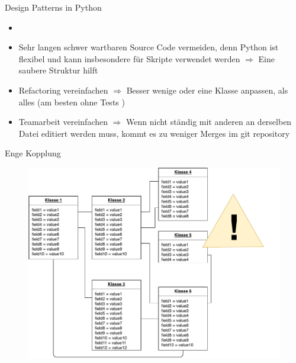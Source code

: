 \begin{frame}{Design Patterns in Python}
    \begin{itemize}
        \setlength{\itemindent}{2.25in}
        \item [\textbf{Motivation: Design Patterns in Python}]
    \end{itemize}

    \begin{itemize}
        \item Sehr langen schwer wartbaren Source Code vermeiden, denn Python ist flexibel und kann insbesondere für Skripte verwendet werden  $\Rightarrow$  Eine saubere Struktur hilft
        \item Refactoring vereinfachen  $\Rightarrow$  Besser wenige oder eine Klasse anpassen, als alles (am besten ohne Tests \smiley{} )
        \item Teamarbeit vereinfachen  $\Rightarrow$  Wenn  nicht ständig mit anderen an derselben Datei editiert werden muss, kommt es zu weniger Merges im git repository
   \end{itemize}

  \end{frame}


\begin{frame}{Enge Kopplung}
    	  \begin{figure}[!htb]
        \includegraphics[scale=0.5]{6-python3/img/tightcoupling}  %
    \end{figure}
\end{frame}


